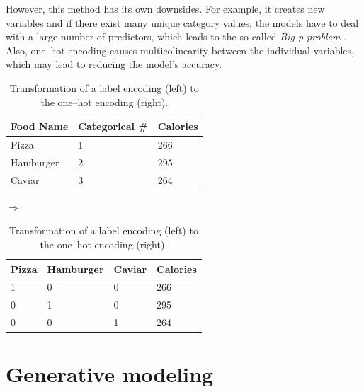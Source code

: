  However, this method has its own downsides. For example, it creates new variables and if there exist many unique category values, the models have to deal with a large number of predictors, which leads to the so-called \emph{Big-p problem} \cite{Bigp}. Also, one--hot encoding causes multicolinearity between the individual variables, which may lead to reducing the model's accuracy. 
 \begin{table}[h]
 \centering
 	\begin{tabular}{|l|l|l|}
 		\hline
 		Food Name & Categorical \# & Calories \\ \hline
 		Pizza     & 1              & 266      \\ \hline
 		Hamburger & 2              & 295      \\ \hline
 		Caviar    & 3              & 264      \\ \hline
 	\end{tabular}
 	\quad $\Rightarrow$ \quad
	\begin{tabular}{|l|l|l|l|}
		\hline
		Pizza & Hamburger & Caviar & Calories \\ \hline
		1     & 0         & 0      & 266      \\ \hline
		0     & 1         & 0      & 295      \\ \hline
		0     & 0         & 1      & 264      \\ \hline
	\end{tabular}
	\caption{Transformation of a label encoding (left) to the one--hot encoding (right).}
	\label{tab:OHE}
 \end{table}
\section{Generative modeling}



